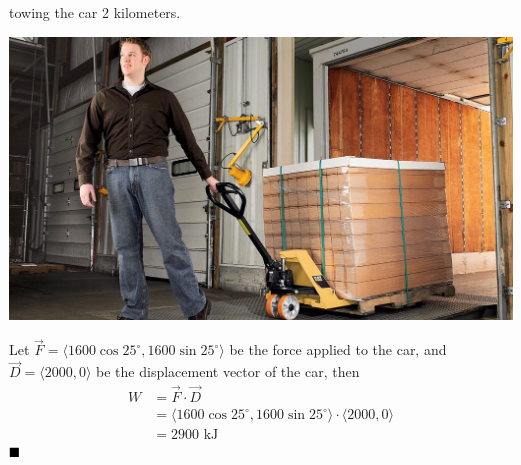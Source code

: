 \begin{enumerate}
          towing the car 2 kilometers.
          \begin{center}
              \includegraphics[scale=0.2,valign=t]{assets/larson11.3q61.jpg}
          \end{center}
          \sol{} Let $\vec{F} = \langle 1600 \cos
              25^{\circ}, 1600 \sin 25^{\circ} \rangle$ be the force applied to the car, and
          $\vec{D} = \langle 2000, 0 \rangle$ be the displacement vector of the car, then
          \begin{align*}
              W & = \vec{F} \cdot \vec{D}                                                                    \\
                & = \langle 1600 \cos 25^{\circ}, 1600 \sin 25^{\circ} \rangle \cdot \langle 2000, 0 \rangle \\
                & = 2900 \text{ kJ}
          \end{align*}
          $\hfill\blacksquare$

\end{enumerate}